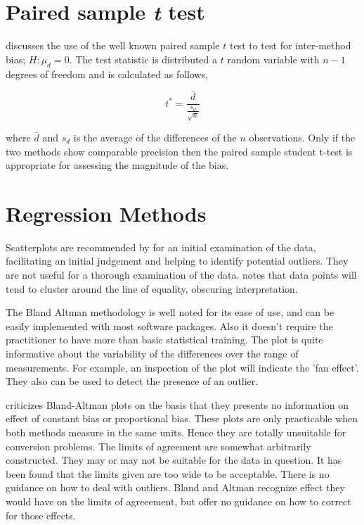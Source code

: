 \documentclass[12pt, a4paper]{report}
\theoremstyle{plain}
\theoremstyle{definition}
\theoremstyle{remark}
\begin{document}
\section{Paired sample \emph{t} test}

\citet{Bartko} discusses the use of the well known paired sample
$t$ test to test for inter-method bias; $H: \mu_{d}=0$. The test
statistic is distributed a $t$ random variable with $n-1$ degrees
of freedom and is calculated as follows,

\begin{equation}
t^{*} = \frac{\bar{d}}{ \frac{s_{d}}{\sqrt{n}}}
\end{equation}

where $\bar{d}$ and $s_{d}$ is the average of the differences of
the $n$ observations. Only if the two methods show comparable
precision then the paired sample student t-test is appropriate for
assessing the magnitude of the bias.




\section{Regression Methods}

Scatterplots are recommended by \citet{BA83} for an initial
examination of the data, facilitating an initial judgement and
helping to identify potential outliers. They are not useful for a
thorough examination of the data. \citet{BritHypSoc} notes that
data points will tend to cluster around the line of equality,
obscuring interpretation.


The Bland Altman methodology is well noted for its ease of use,
and can be easily implemented with most software packages. Also it
doesn't require the practitioner to have more than basic
statistical training. The plot is quite informative about the
variability of the differences over the range of measurements. For
example, an inspection of the plot will indicate the 'fan effect'.
They also can be used to detect the presence of an outlier.

\citet{ludbrook97,ludbrook02} criticizes Bland-Altman plots on the
basis that they presents no information on effect of constant bias
or proportional bias. These plots are only practicable when both
methods measure in the same units. Hence they are totally
unsuitable for conversion problems. The limits of agreement are
somewhat arbitrarily constructed. They may or may not be suitable
for the data in question. It has been found that the limits given
are too wide to be acceptable. There is no guidance on how to deal
with outliers. Bland and Altman recognize effect they would have
on the limits of agreeement, but offer no guidance on how to
correct for those effects.
\end{document}
